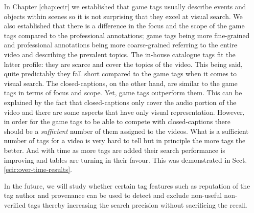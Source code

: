 In Chapter \ref{chap:ecir} we established that game tags usually describe events and objects within scenes so it is not surprising that they excel at visual search. We also established that there is a difference in the focus and the scope of the game tags compared to the professional annotations; game tags being more fine-grained and professional annotations being more coarse-grained referring to the entire video and describing the prevalent topics. The in-house catalogue tags fit the latter profile: they are scarce and cover the topics of the video. This being said, quite predictably they fall short compared to the game tags when it comes to visual search. The closed-captions, on the other hand, are similar to the game tags in terms of focus and scope. Yet, game tags outperform them. This can be explained by the fact that closed-captions only cover the audio portion of the video and there are some aspects that have only visual representation. However, in order for the game tags to be able to compete with closed-captions there should be a \textit{sufficient} number of them assigned to the videos. What is a sufficient number of tags for a video is very hard to tell but in principle the more tags the better. And with time as more tags are added their search performance is improving and tables are turning in their favour. This was demonstrated in Sect. \ref{ecir:over-time-results}.

In the future, we will study whether certain tag features such as reputation of the tag author and provenance can be used to detect and exclude non-useful non-verified tags thereby increasing the search precision without sacrificing the recall. 
